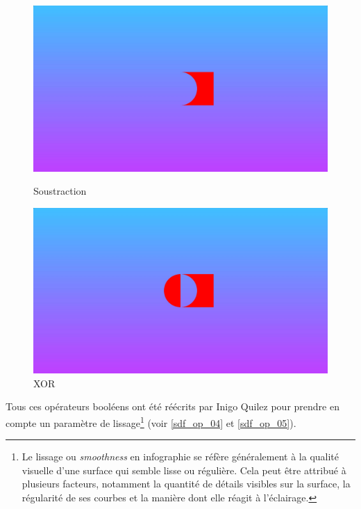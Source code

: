 \begin{figure}[h]
  \begin{minipage}[b]{0.45\linewidth}
    \centering
    \includegraphics[width=\linewidth]{images/sdf/sdf_op_02.JPG}
    \caption{Soustraction}
    \label{sdf_op_02}
  \end{minipage}
  \hspace{0.1\linewidth} %
  \begin{minipage}[b]{0.45\linewidth}
    \centering
    \includegraphics[width=\linewidth]{images/sdf/sdf_op_03.JPG}
    \caption{XOR}
    \label{sdf_op_03}
  \end{minipage}
\end{figure}

Tous ces opérateurs booléens ont été réécrits par Inigo Quilez pour prendre en compte un paramètre de lissage\footnote{Le lissage ou \textit{smoothness} en infographie se réfère généralement à la qualité visuelle d'une surface qui semble lisse ou régulière. Cela peut être attribué à plusieurs facteurs, notamment la quantité de détails visibles sur la surface, la régularité de ses courbes et la manière dont elle réagit à l'éclairage.} (voir \ref{sdf_op_04} et \ref{sdf_op_05}).

